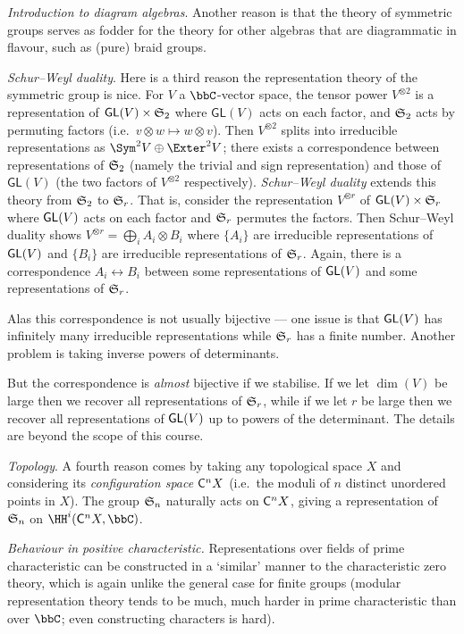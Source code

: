 \emph{Introduction to diagram algebras}. Another reason is that the theory of
symmetric groups serves as fodder for the theory for other algebras that are
diagrammatic in flavour, such as (pure) braid groups.

\emph{Schur--Weyl duality}. Here is a third reason the representation theory
of the symmetric group is nice. For $V$ a $\bbC$-vector space, the tensor power
$V^{\otimes 2}$ is a representation of $\mathsf{GL}(V)\times \sym{2}$ where
$\mathsf{GL}(V)$ acts on each factor, and $\sym{2}$ acts by permuting factors
(i.e.\ $v\otimes w\mapsto w\otimes v$). Then $V^{\otimes 2}$ splits into
irreducible representations as $\Sym^2 V \oplus \Exter^2 V$; there exists a
correspondence between representations of $\sym{2}$ (namely the trivial and sign
representation) and those of $\mathsf{GL}(V)$ (the two factors of $V^{\otimes
2}$ respectively). \emph{Schur--Weyl duality} extends this theory from $\sym{2}$
to $\sym{r}$. That is, consider the representation $V^{\otimes r}$ of
$\GL{V}\times \sym{r}$ where $\GL{V}$ acts on each factor and $\sym{r}$ permutes
the factors. Then Schur--Weyl duality shows $V^{\otimes r}=\bigoplus_i
A_i\otimes B_i$ where $\{A_i\}$ are irreducible representations of $\GL{V}$ and
$\{B_i\}$ are irreducible representations of $\sym{r}$. Again, there is a
correspondence $A_i\leftrightarrow B_i$ between some representations of $\GL{V}$
and some representations of $\sym{r}$.

Alas this correspondence is not usually bijective --- one issue is that $\GL{V}$
has infinitely many irreducible representations while $\sym{r}$ has a finite
number. Another problem is taking inverse powers of determinants. 

But the correspondence is \emph{almost} bijective if we stabilise. If we let $\dim(V)$
be large then we recover all representations of $\sym{r}$, while if we let $r$
be large then we recover all representations of $\GL{V}$ up to powers of the
determinant. The details are beyond the scope of this course. 

\emph{Topology}. A fourth reason comes by taking any topological space $X$
and considering its \emph{configuration space} $\sf{C}^nX$ (i.e.\ the moduli of
$n$ distinct unordered points in $X$). The group $\sym{n}$ naturally acts on
$\sf{C}^n X$, giving a representation of $\sym{n}$ on $\HH^i(\sf{C}^nX, \bbC)$.

\emph{Behaviour in positive characteristic.} Representations over fields of
prime characteristic can be constructed in a `similar' manner to the
characteristic zero theory, which is again unlike the general case for finite
groups (modular representation theory tends to be much, much harder in
prime characteristic than over $\bbC$; even constructing characters is hard).

